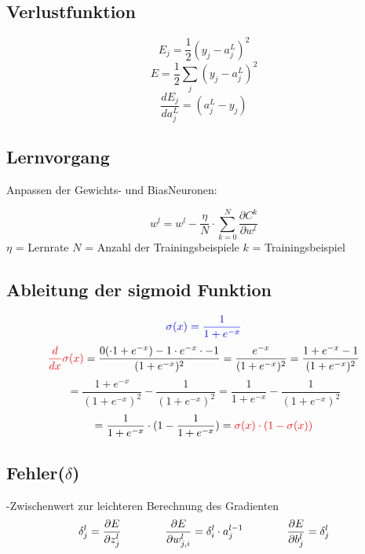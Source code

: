 \documentclass{article}
\begin{document}
\subsection{Verlustfunktion}
\[ E_j = \frac{1}{2}(y_j - a_j^L)^2 \]
\[ E = \frac{1}{2}\sum_{j}^{} (y_j - a_j^L)^2 \]
\[ \frac{dE_j}{da_{j}^L}  = (a_j^L - y_j) \]


\subsection{Lernvorgang}
Anpassen der Gewichts- und BiasNeuronen:

\[ w^l = w^l - \frac{\eta}{N} \cdot \sum_{k = 0}^{N} \frac{\partial C^k}{\partial w^l} \]
$\eta$ = Lernrate \kern 20pt $N$ = Anzahl der Trainingsbeispiele \kern 20pt $k$ = Trainingsbeispiel 


\subsection{Ableitung der sigmoid Funktion}
\[ \textcolor{blue}{ \sigma(x) = \frac{1}{1 + e^{-x}} } \]
\[ \textcolor{red}{ \frac{d}{dx}\sigma(x) } = \frac{
0( \cdot 1 + e^{-x}) - 1 \cdot e^{-x} \cdot -1
}{
    (1 + e^{-x})^2
} = \frac{e^{-x}}{(1 + e^{-x})^2} 
= \frac{1 + e^{-x} - 1}{(1 + e^{-x})^2} \]
\[ =\frac{1 + e^{-x}}{(1 + e^{-x})^2} - \frac{1}{(1 + e^{-x})^2} 
= \frac{1}{1 + e^{-x}} - \frac{1}{(1 + e^{-x})^2} \]
\[ = \frac{1}{1 + e^{-x}} \cdot (1 - \frac{1}{1 + e^{-x}}) 
= \textcolor{red}{ \sigma(x) \cdot (1 - \sigma(x)) } \]



\subsection{Fehler($\delta$)}
-Zwischenwert zur leichteren Berechnung des Gradienten
\[ \delta_j^l = \frac{\partial E}{\partial z_j^l} 
\kern 40pt
 \frac{\partial E}{\partial w_{j,i}^l} = \delta_i^l \cdot a_j^{l-1}
\kern 40pt
\frac{\partial E}{\partial b_j^l} = \delta_j^l \]
\end{document}
